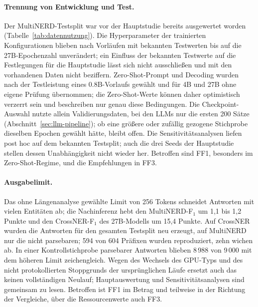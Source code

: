 \paragraph{Trennung von Entwicklung und Test.}
Der MultiNERD-Testsplit war vor der Hauptstudie bereits ausgewertet worden
(Tabelle~\ref{tab:datennutzung}).
Die Hyperparameter der trainierten Konfigurationen blieben nach
Vorläufen mit bekannten Testwerten bis auf die 27B-Epochenzahl
unverändert; ein Einfluss der bekannten Testwerte auf die Festlegungen
für die Hauptstudie lässt sich nicht ausschließen und mit den vorhandenen Daten nicht beziffern.
Zero-Shot-Prompt und Decoding wurden nach der Testleistung eines
0.8B-Vorlaufs gewählt und für 4B und 27B ohne eigene Prüfung
übernommen; die Zero-Shot-Werte können daher optimistisch verzerrt sein
und beschreiben nur genau diese Bedingungen.
Die Checkpoint-Auswahl nutzte allein Validierungsdaten, bei den LLMs
nur die ersten 200 Sätze (Abschnitt~\ref{sec:llm-pipeline}); ob eine
größere oder zufällig gezogene Stichprobe dieselben Epochen gewählt
hätte, bleibt offen.
Die Sensitivitätsanalysen liefen post hoc auf dem bekannten Testsplit;
auch die drei Seeds der Hauptstudie stellen dessen Unabhängigkeit nicht
wieder her.
Betroffen sind FF1, besonders im Zero-Shot-Regime, und die Empfehlungen in
FF3.

\paragraph{Ausgabelimit.}
Das ohne Längenanalyse gewählte Limit von 256 Tokens schneidet Antworten
mit vielen Entitäten ab; die Nachinferenz hebt den MultiNERD-F$_1$ um 1,1
bis 1,2 Punkte und den CrossNER-F$_1$ des 27B-Modells um 15,4 Punkte.
Auf CrossNER wurden die Antworten für den gesamten Testsplit neu erzeugt,
auf MultiNERD nur die nicht parsebaren; 594 von 604 Präfixen wurden reproduziert,
zehn wichen ab.
In einer Kontrollstichprobe parsebarer Antworten blieben
8\,988 von 9\,000 mit dem höheren Limit zeichengleich.
Wegen des Wechsels des GPU-Typs und des nicht protokollierten
Stoppgrunds der ursprünglichen Läufe ersetzt auch das keinen
vollständigen Neulauf;
Hauptauswertung und Sensitivitätsanalysen sind gemeinsam zu lesen.
Betroffen ist FF1 im Betrag und teilweise in der Richtung der Vergleiche,
über die Ressourcenwerte auch FF3.

